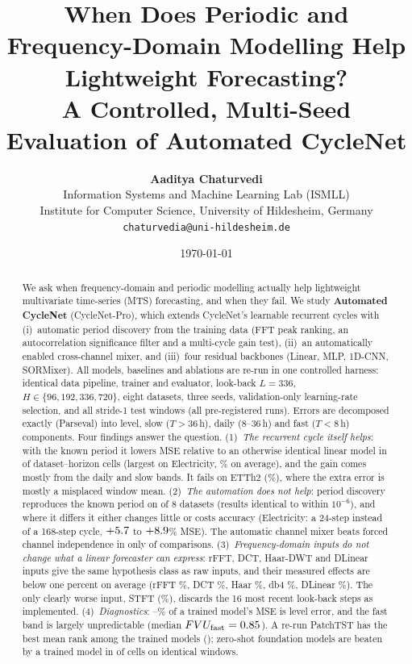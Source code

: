 \documentclass[11pt,a4paper]{article}
\title{\textbf{When Does Periodic and Frequency-Domain Modelling Help Lightweight Forecasting?\\A Controlled, Multi-Seed Evaluation of Automated CycleNet}}
\author{
    \textbf{Aaditya Chaturvedi}\\
    Information Systems and Machine Learning Lab (ISMLL)\\
    Institute for Computer Science, University of Hildesheim, Germany\\
    \texttt{chaturvedia@uni-hildesheim.de}
}
\date{\today}
\begin{document}
\maketitle

\begin{abstract}
We ask when frequency-domain and periodic modelling actually help lightweight multivariate time-series (MTS) forecasting, and when they fail. We study \textbf{Automated CycleNet} (CycleNet-Pro), which extends CycleNet's learnable recurrent cycles with (i)~automatic period discovery from the training data (FFT peak ranking, an autocorrelation significance filter and a multi-cycle gain test), (ii)~an automatically enabled cross-channel mixer, and (iii)~four residual backbones (Linear, MLP, 1D-CNN, SORMixer). All models, baselines and ablations are re-run in one controlled harness: identical data pipeline, trainer and evaluator, look-back $L=336$, $H\in\{96,192,336,720\}$, eight datasets, three seeds, validation-only learning-rate selection, and all stride-1 test windows (all \vRunsExpected{} pre-registered runs). Errors are decomposed exactly (Parseval) into level, slow ($T>36$\,h), daily ($8$--$36$\,h) and fast ($T<8$\,h) components. Four findings answer the question. (1)~\emph{The recurrent cycle itself helps}: with the known period it lowers MSE relative to an otherwise identical linear model in \vCycleWins{} of \vCycleCells{} dataset--horizon cells (largest on Electricity, \vCycleElectricity\% on average), and the gain comes mostly from the daily and slow bands. It fails on ETTh2 (\vCycleETThTwo\%), where the extra error is mostly a misplaced window mean. (2)~\emph{The automation does not help}: period discovery reproduces the known period on \vPeriodSameCount{} of 8 datasets (results identical to within $10^{-6}$), and where it differs it either changes little or costs accuracy (Electricity: a 24-step instead of a 168-step cycle, $+5.7$ to $+8.9$\% MSE). The automatic channel mixer beats forced channel independence in only \vMixWins{} of \vMixCells{} comparisons. (3)~\emph{Frequency-domain inputs do not change what a linear forecaster can express}: rFFT, DCT, Haar-DWT and DLinear inputs give the same hypothesis class as raw inputs, and their measured effects are below one percent on average (rFFT \vTrRfftMean\%, DCT \vTrDctMean\%, Haar \vTrHaarMean\%, db4 \vTrDbfourMean\%, DLinear \vTrDlinMean\%). The only clearly worse input, STFT (\vTrStftMean\%), discards the 16 most recent look-back steps as implemented. (4)~\emph{Diagnostics}: \vLevelShareMin--\vLevelShareMax\% of a trained model's MSE is level error, and the fast band is largely unpredictable (median $FVU_{\text{fast}}=0.85$). A re-run PatchTST has the best mean rank among the \vNumTrainedModels{} trained models (\vRankPatch); zero-shot foundation models are beaten by a trained model in \vFoundTrainedBest{} of \vFoundCells{} cells on identical windows.
\end{abstract}
\end{document}
